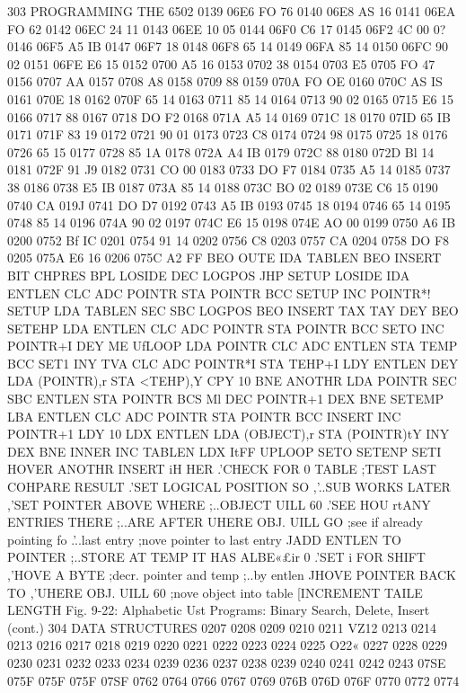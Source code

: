 \documentclass{book}
\begin{document}
{{{{{{{{{{303
PROGRAMMING THE 6502
0139 06E6 FO 76
0140 06E8 AS 16
0141 06EA FO 62
0142 06EC 24 11
0143 06EE 10 05
0144 06F0 C6 17
0145 06F2 4C 00 0?
0146 06F5 A5 IB
0147 06F7 18
0148 06F8 65 14
0149 06FA 85 14
0150 06FC 90 02
0151 06FE E6 15
0152 0700 A5 16
0153 0702 38
0154 0703 E5  0705 FO 47
0156 0707 AA
0157 0708 A8
0158 0709 88
0159 070A FO OE
0160 070C AS IS
0161 070E 18
0162 070F 65 14
0163 0711 85 14
0164 0713 90 02
0165 0715 E6 15
0166 0717 88
0167 0718 DO F2
0168 071A A5 14
0169 071C 18
0170 07ID 65 IB
0171 071F 83 19
0172 0721 90 01
0173 0723 C8
0174 0724 98
0175 0725 18
0176 0726 65 15
0177 0728 85 1A
0178 072A A4 IB
0179 072C 88
0180 072D Bl 14
0181 072F 91 J9
0182 0731 CO 00
0183 0733 DO F7
0184 0735 A5 14
0185 0737 38
0186 0738 E5 IB
0187 073A 85 14
0188 073C BO 02
0189 073E C6 15
0190 0740 CA
019J 0741 DO D7
0192 0743 A5 IB
0193 0745 18
0194 0746 65 14
0195 0748 85 14
0196 074A 90 02
0197 074C E6 15
0198 074E AO 00
0199 0750 A6 IB
0200 0752 Bf IC
0201 0754 91 14
0202 0756 C8
0203 0757 CA
0204 0758 DO F8
0205 075A E6 16
0206 075C A2 FF
BEO OUTE
IDA TABLEN
BEO INSERT
BIT CHPRES
BPL LOSIDE
DEC LOGPOS
JHP SETUP
LOSIDE IDA ENTLEN
CLC
ADC POINTR
STA POINTR
BCC SETUP
INC POINTR*!
SETUP LDA TABLEN
SEC
SBC LOGPOS
BEO INSERT
TAX
TAY
DEY
BEO SETEHP
LDA ENTLEN
CLC
ADC POINTR
STA POINTR
BCC SETO
INC POINTR+I
DEY
ME UfLOOP
LDA POINTR
CLC
ADC ENTLEN
STA TEMP
BCC SET1
INY
TVA
CLC
ADC POINTR*I
STA TEHP+I
LDY ENTLEN
DEY
LDA (POINTR),r
STA <TEHP),Y
CPY 10
BNE ANOTHR
LDA POINTR
SEC
SBC ENTLEN
STA POINTR
BCS Ml
DEC POINTR+1
DEX
BNE SETEMP
LBA ENTLEN
CLC
ADC POINTR
STA POINTR
BCC INSERT
INC POINTR+1
LDY 10
LDX ENTLEN
LDA (OBJECT),r
STA (POINTR)tY
INY
DEX
BNE INNER
INC TABLEN
LDX ItFF
UPLOOP
SETO
SETENP
SETI
HOVER
ANOTHR
INSERT
iH HER
.'CHECK FOR 0 TABLE
;TEST LAST COHPARE RESULT
.'SET LOGICAL POSITION SO
,'..SUB WORKS LATER
,'SET POINTER ABOVE WHERE
;..OBJECT UILL 60
.'SEE HOU rtANY ENTRIES THERE
;..ARE AFTER UHERE OBJ. UILL GO
;see if already pointing fo
.'..last entry
;nove pointer to last entry
JADD ENTLEN TO POINTER
;..STORE AT TEMP
IT HAS ALBE«£ir 0
.'SET i FOR SHIFT
,'HOVE A BYTE
;decr. pointer and temp
;..by entlen
JHOVE POINTER BACK TO
,'UHERE OBJ. UILL 60
;nove object into table
[INCREMENT TAILE LENGTH
Fig. 9-22: Alphabetic Ust Programs: Binary Search, Delete, Insert (cont.)
304
DATA STRUCTURES
0207
0208
0209
0210
0211
VZ12
0213
0214
0213
0216
0217
0218
0219
0220
0221
0222
0223
0224
0225
O22«
0227
0228
0229
0230
0231
0232
0233
0234
0239
0236
0237
0238
0239
0240
0241
0242
0243
07SE
075F
075F
075F
07SF
0762
0764
0766
0767
0769
076B
076D
076F
0770
0772
0774
}}}}}}}}}}
\end{document}
